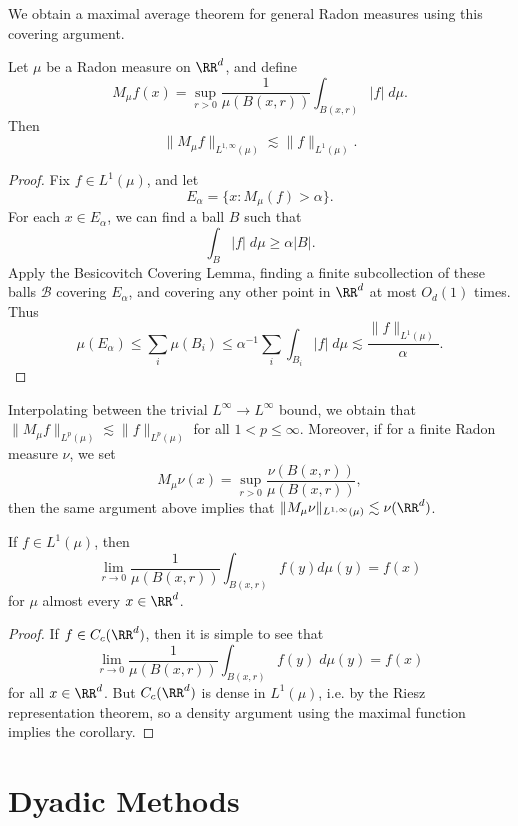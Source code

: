We obtain a maximal average theorem for general Radon measures using this covering argument.

\begin{theorem}
    Let $\mu$ be a Radon measure on $\RR^d$, and define
    \[ M_\mu f(x) = \sup_{r > 0} \frac{1}{\mu(B(x,r))} \int_{B(x,r)} |f|\; d\mu. \]
    Then
    \[ \| M_\mu f \|_{L^{1,\infty}(\mu)} \lesssim \| f \|_{L^1(\mu)}. \]
\end{theorem}
\begin{proof}
    Fix $f \in L^1(\mu)$, and let
    \[ E_\alpha = \{ x : M_\mu(f) > \alpha \}. \]
    For each $x \in E_\alpha$, we can find a ball $B$ such that
    \[ \int_B |f|\; d\mu \geq \alpha |B|. \]
    Apply the Besicovitch Covering Lemma, finding a finite subcollection of these balls $\mathcal{B}$ covering $E_\alpha$, and covering any other point in $\RR^d$ at most $O_d(1)$ times. Thus
    \[ \mu(E_\alpha) \leq \sum_i \mu(B_i) \leq \alpha^{-1} \sum_i \int_{B_i} |f|\; d\mu \lesssim \frac{\| f \|_{L^1(\mu)}}{\alpha}. \]
\end{proof}

Interpolating between the trivial $L^\infty \to L^\infty$ bound, we obtain that $\| M_\mu f \|_{L^p(\mu)} \lesssim \| f \|_{L^p(\mu)}$ for all $1 < p \leq \infty$. Moreover, if for a finite Radon measure $\nu$, we set
%
\[ M_\mu \nu(x) = \sup_{r > 0} \frac{\nu(B(x,r))}{\mu(B(x,r))}, \]
%
then the same argument above implies that $\| M_\mu \nu \|_{L^{1,\infty}(\mu)} \lesssim \nu(\RR^d)$.

\begin{corollary}
    If $f \in L^1(\mu)$, then
    \[ \lim_{r \to 0} \frac{1}{\mu(B(x,r))} \int_{B(x,r)} f(y) d\mu(y) = f(x) \]
    for $\mu$ almost every $x \in \RR^d$.
\end{corollary}
\begin{proof}
    If $f \in C_c(\RR^d)$, then it is simple to see that
    \[ \lim_{r \to 0} \frac{1}{\mu(B(x,r))} \int_{B(x,r)} f(y)\; d\mu(y) = f(x) \]
    for all $x \in \RR^d$. But $C_c(\RR^d)$ is dense in $L^1(\mu)$, i.e. by the Riesz representation theorem, so a density argument using the maximal function implies the corollary.
\end{proof}





\section{Dyadic Methods}

